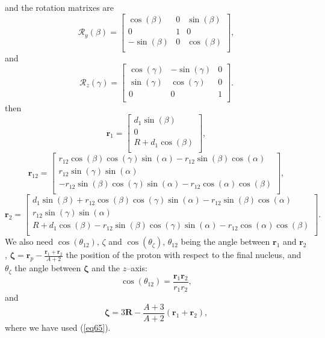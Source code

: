 and the rotation matrixes are
\begin{equation}\label{eq80}
\mathcal{R}_y(\beta)=
\begin{bmatrix}
  \cos(\beta)&0&\sin(\beta)\\
 0&1&0\\
 -\sin(\beta)&0&\cos(\beta)\\
\end{bmatrix},
\end{equation}
and
\begin{equation}\label{eq81}
\mathcal{R}_z(\gamma)=
\begin{bmatrix}
  \cos(\gamma)&-\sin(\gamma)&0\\
 \sin(\gamma)&\cos(\gamma)&0\\
 0&0&1\\
\end{bmatrix}.
\end{equation}
then
\begin{equation}\label{eq82}
\mathbf{r}_1=
\begin{bmatrix}
  d_1\sin(\beta)\\
 0\\
 R+d_1\cos(\beta)\\
\end{bmatrix},
\end{equation}
\begin{equation}\label{eq83}
\mathbf{r}_{12}=
\begin{bmatrix}
  r_{12}\cos(\beta)\cos(\gamma)\sin(\alpha)-r_{12}\sin(\beta)\cos(\alpha)\\
 r_{12}\sin(\gamma)\sin(\alpha)\\
 -r_{12}\sin(\beta)\cos(\gamma)\sin(\alpha)-r_{12}\cos(\alpha)\cos(\beta)\\
\end{bmatrix},
\end{equation}
\begin{equation}\label{eq84}
\mathbf{r}_{2}=
\begin{bmatrix}
  d_1\sin(\beta)+r_{12}\cos(\beta)\cos(\gamma)\sin(\alpha)-r_{12}\sin(\beta)\cos(\alpha)\\
 r_{12}\sin(\gamma)\sin(\alpha)\\
 R+d_1\cos(\beta)-r_{12}\sin(\beta)\cos(\gamma)\sin(\alpha)-r_{12}\cos(\alpha)\cos(\beta)\\
\end{bmatrix}.
\end{equation}
We also need $\cos(\theta_{12})$, $\zeta$ and $\cos(\theta_{\zeta})$, $\theta_{12}$ being the angle between $\mathbf{r}_{1}$ and $\mathbf{r}_{2}$, $\boldsymbol{\zeta}=\mathbf{r}_p-\tfrac{\mathbf{r}_1+\mathbf{r}_2}{A+2}$ the position of the proton with respect to the final nucleus, and $\theta_{\zeta}$ the angle between $\boldsymbol{\zeta}$ and the $z$--axis:
\begin{equation}\label{eq85}
    \cos(\theta_{12})=\frac{\mathbf{r}_{1}\mathbf{r}_{2}}{r_1r_2},
\end{equation}
and
\begin{equation}\label{eq86}
    \boldsymbol{\zeta}=3\mathbf{R}-\frac{A+3}{A+2}(\mathbf{r}_1+\mathbf{r}_2),
\end{equation}
where we have used (\ref{eq65}).


